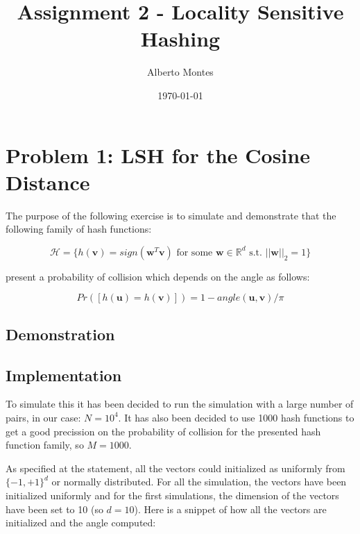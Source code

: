 \documentclass{ethz_report}
\title{Assignment 2 - Locality Sensitive Hashing}
\author{Alberto Montes}
\date{\today}
\begin{document}
\maketitle

\section*{Problem 1: LSH for the Cosine Distance}

The purpose of the following exercise is to simulate and demonstrate that the following family of hash functions:

\begin{equation}
    \mathcal{H} = \{ h(\mathbf{v}) = sign(\mathbf{w}^T \mathbf{v}) \text{ for some } \mathbf{w} \in \mathbb{R}^d \text{ s.t. } ||\mathbf{w}||_2 = 1 \}
\end{equation}

present a probability of collision which depends on the angle as follows:

\begin{equation}
    Pr([h(\mathbf{u})=h(\mathbf{v})]) = 1 - angle(\mathbf{u}, \mathbf{v}) / \pi
    \label{eq:similarity}
\end{equation}

\subsection*{Demonstration}



\subsection*{Implementation}

To simulate this it has been decided to run the simulation with a large number of pairs, in our case: $N = 10^4$. It has also been decided to use 1000 hash functions to get a good precission on the probability of collision for the presented hash function family, so $M = 1000$.

As specified at the statement, all the vectors could initialized as uniformly from $\{-1,+1\}^d$ or normally distributed. For all the simulation, the vectors have been initialized uniformly and for the first simulations, the dimension of the vectors have been set to 10 (so $d=10$). Here is a snippet of how all the vectors are initialized and the angle computed:


\end{document}
